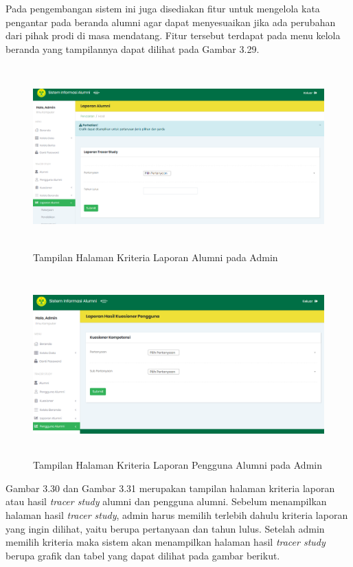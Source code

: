 Pada pengembangan sistem ini juga disediakan fitur untuk mengelola kata pengantar pada beranda alumni agar dapat menyesuaikan jika ada perubahan dari pihak prodi di masa mendatang. Fitur tersebut terdapat pada menu kelola beranda yang tampilannya dapat dilihat pada Gambar 3.29. 

\begin{figure}[H]
	\centering
	\includegraphics[width=14cm,height=7cm]{gambar/tampilan/admin_cariLaporan}
	\caption{Tampilan Halaman Kriteria Laporan Alumni pada Admin }
	\label{ui_adminCariLaporan}
\end{figure}

\begin{figure}[H]
	\centering
	\includegraphics[width=14cm,height=7cm]{gambar/tampilan/admin_cariLaporanPengguna}
	\caption{Tampilan Halaman Kriteria Laporan Pengguna Alumni pada Admin }
	\label{ui_adminCariLaporanPengguna}
\end{figure}

Gambar 3.30 dan Gambar 3.31 merupakan tampilan halaman kriteria laporan atau hasil \textit{tracer study} alumni dan pengguna alumni. Sebelum menampilkan halaman hasil \textit{tracer study}, admin harus memilih terlebih dahulu kriteria laporan yang ingin dilihat, yaitu berupa pertanyaan dan tahun lulus. Setelah admin memilih kriteria maka sistem akan menampilkan halaman hasil \textit{tracer study} berupa grafik dan tabel yang dapat dilihat pada gambar berikut. 

